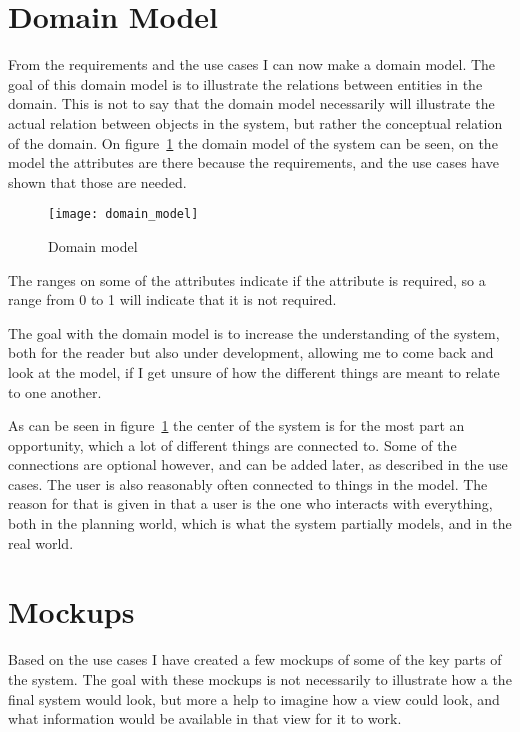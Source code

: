 \section{Domain Model}
\label{sec:Domain Model}
From the requirements and the use cases I can now make a domain model. The goal of this domain model is to illustrate the relations between entities in the domain\cite{larman}. This is not to say that the domain model necessarily will illustrate the actual relation between objects in the system, but rather the conceptual relation of the domain. On figure~\ref{fig:domain_model} the domain model of  the system can be seen, on the model the attributes are there because the requirements, and the use cases have shown that those are needed.

\begin{figure}[!htb]
  \centering
  \texttt{[image: domain\_model]}
  \caption{Domain model}
  \label{fig:domain_model}
\end{figure}

The ranges on some of the attributes indicate if the attribute is required, so a range from 0 to 1 will indicate that it is not required.

The goal with the domain model is to increase the understanding of the system, both for the reader but also under development, allowing me to come back and look at the model, if I get unsure of how the different things are meant to relate to one another.

As can be seen in figure~\ref{fig:domain_model} the center of the system is for the most part an opportunity, which a lot of different things are connected to. Some of the connections are optional however, and can be added later, as described in the use cases. The user is also reasonably often connected to things in the model. The reason for that is given in that a user is the one who interacts with everything, both in the planning world, which is what the system partially models, and in the real world.

\section{Mockups}
\label{sec:Mockups}
Based on the use cases I have created a few mockups of some of the key parts of
the system. The goal with these mockups is not necessarily to illustrate how a
the final system would look, but more a help to imagine how a view could look,
and what information would be available in that view for it to work.

